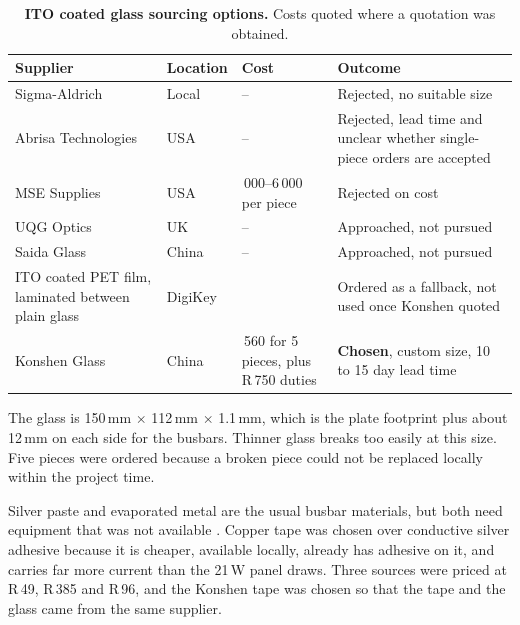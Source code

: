 \begin{table}[H]
    \centering
    \caption[ITO coated glass sourcing options]{\textbf{ITO coated glass sourcing options.} Costs quoted where a quotation was obtained.}
    \label{tab:ito-options}
    \footnotesize
    \setlength{\tabcolsep}{4pt}
    \renewcommand{\arraystretch}{1.15}
    \begin{tabular}{@{}>{\raggedright\arraybackslash}p{4.2cm}>{\raggedright\arraybackslash}p{2.2cm}>{\raggedright\arraybackslash}p{2.4cm}>{\raggedright\arraybackslash}p{7.8cm}@{}}
        \toprule
        \textbf{Supplier} & \textbf{Location} & \textbf{Cost} & \textbf{Outcome} \\
        \midrule
        Sigma-Aldrich & Local & -- & Rejected, no suitable size \\
        \addlinespace[2pt]
        Abrisa Technologies & USA & -- & Rejected, lead time and unclear whether single-piece orders are accepted \\
        \addlinespace[2pt]
        MSE Supplies & USA & 3\,000--6\,000 per piece & Rejected on cost \\
        \addlinespace[2pt]
        UQG Optics & UK & -- & Approached, not pursued \\
        \addlinespace[2pt]
        Saida Glass & China & -- & Approached, not pursued \\
        \addlinespace[2pt]
        ITO coated PET film, laminated between plain glass & DigiKey & 165 & Ordered as a fallback, not used once Konshen quoted \\
        \addlinespace[2pt]
        Konshen Glass & China & 2\,560 for 5 pieces, plus R\,750 duties & \textbf{Chosen}, custom size, 10 to 15 day lead time \\
        \bottomrule
    \end{tabular}
\end{table}

The glass is 150\,mm $\times$ 112\,mm $\times$ 1.1\,mm, which is the plate footprint plus about 12\,mm on each side for the busbars. Thinner glass breaks too easily at this size. Five pieces were ordered because a broken piece could not be replaced locally within the project time.

Silver paste and evaporated metal are the usual busbar materials, but both need equipment that was not available \citep{konshen_ito_2026}. Copper tape was chosen over conductive silver adhesive because it is cheaper, available locally, already has adhesive on it, and carries far more current than the 21\,W panel draws. Three sources were priced at R\,49, R\,385 and R\,96, and the Konshen tape was chosen so that the tape and the glass came from the same supplier.

